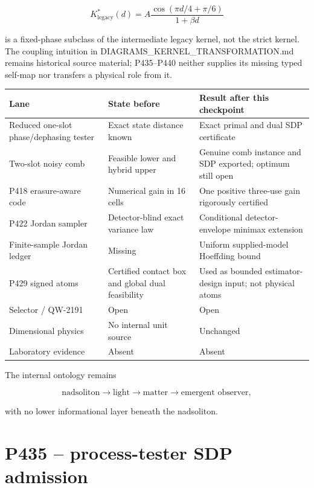 \documentclass[11pt,a4paper,openany]{report}
\begin{document}
\[
K^*_{\mathrm{legacy}}(d)
=A\frac{\cos(\pi d/4+\pi/6)}{1+\beta d}
\]

is a fixed-phase subclass of the intermediate legacy kernel, not the strict kernel. The coupling intuition in DIAGRAMS\_KERNEL\_TRANSFORMATION.md remains historical source material; P435--P440 neither supplies its missing typed self-map nor transfers a physical role from it.

\begin{center}
\begingroup\small
\setlength{\tabcolsep}{2.5pt}
\renewcommand{\arraystretch}{1.16}
\begin{longtable}{@{}p{}p{}p{}@{}}
\toprule
\textbf{Lane} & \textbf{State before} & \textbf{Result after this checkpoint} \\
\midrule
\endhead
Reduced one-slot phase/\allowbreak{}dephasing tester & Exact state distance known & Exact primal and dual SDP certificate \\
Two-slot noisy comb & Feasible lower and hybrid upper & Genuine comb instance and SDP exported; optimum still open \\
P418 erasure-aware code & Numerical gain in 16 cells & One positive three-use gain rigorously certified \\
P422 Jordan sampler & Detector-blind exact variance law & Conditional detector-envelope minimax extension \\
Finite-sample Jordan ledger & Missing & Uniform supplied-model Hoeffding bound \\
P429 signed atoms & Certified contact box and global dual feasibility & Used as bounded estimator-design input; not physical atoms \\
Selector /\allowbreak{} QW-2191 & Open & Open \\
Dimensional physics & No internal unit source & Unchanged \\
Laboratory evidence & Absent & Absent \\
\bottomrule
\end{longtable}
\endgroup
\end{center}

The internal ontology remains

\[
\text{nadsoliton}\longrightarrow\text{light}\longrightarrow
\text{matter}\longrightarrow\text{emergent observer},
\]

with no lower informational layer beneath the nadsoliton.

\chapter{P435 -- process-tester SDP admission}
\end{document}

